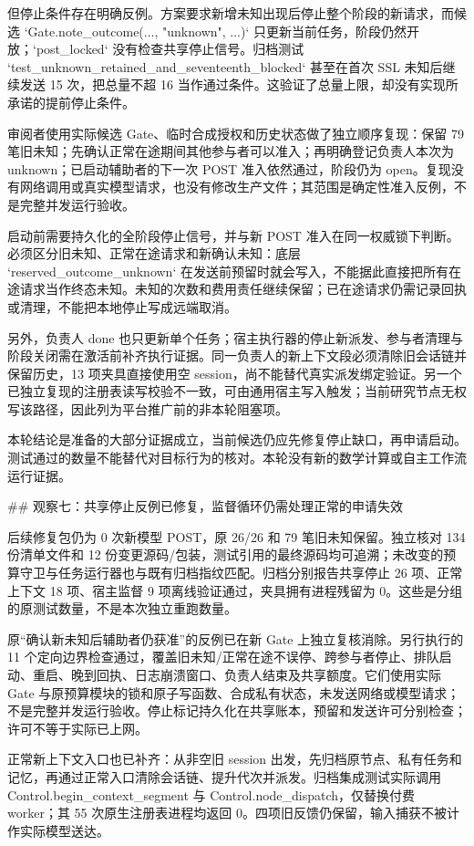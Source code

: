 但停止条件存在明确反例。方案要求新增未知出现后停止整个阶段的新请求，而候选 `Gate.note_outcome(..., "unknown", ...)` 只更新当前任务，阶段仍然开放；`post_locked` 没有检查共享停止信号。归档测试 `test_unknown_retained_and_seventeenth_blocked` 甚至在首次 SSL 未知后继续发送 15 次，把总量不超 16 当作通过条件。这验证了总量上限，却没有实现所承诺的提前停止条件。

审阅者使用实际候选 Gate、临时合成授权和历史状态做了独立顺序复现：保留 79 笔旧未知；先确认正常在途期间其他参与者可以准入；再明确登记负责人本次为 unknown；已启动辅助者的下一次 POST 准入依然通过，阶段仍为 open。复现没有网络调用或真实模型请求，也没有修改生产文件；其范围是确定性准入反例，不是完整并发运行验收。

启动前需要持久化的全阶段停止信号，并与新 POST 准入在同一权威锁下判断。必须区分旧未知、正常在途请求和新确认未知：底层 `reserved_outcome_unknown` 在发送前预留时就会写入，不能据此直接把所有在途请求当作终态未知。未知的次数和费用责任继续保留；已在途请求仍需记录回执或清理，不能把本地停止写成远端取消。

另外，负责人 done 也只更新单个任务；宿主执行器的停止新派发、参与者清理与阶段关闭需在激活前补齐执行证据。同一负责人的新上下文段必须清除旧会话链并保留历史，13 项夹具直接使用空 session，尚不能替代真实派发绑定验证。另一个已独立复现的注册表读写校验不一致，可由通用宿主写入触发；当前研究节点无权写该路径，因此列为平台推广前的非本轮阻塞项。

本轮结论是准备的大部分证据成立，当前候选仍应先修复停止缺口，再申请启动。测试通过的数量不能替代对目标行为的核对。本轮没有新的数学计算或自主工作流运行证据。

## 观察七：共享停止反例已修复，监督循环仍需处理正常的申请失效

后续修复包仍为 0 次新模型 POST，原 26/26 和 79 笔旧未知保留。独立核对 134 份清单文件和 12 份变更源码/包装，测试引用的最终源码均可追溯；未改变的预算守卫与任务运行器也与既有归档指纹匹配。归档分别报告共享停止 26 项、正常上下文 18 项、宿主监督 9 项离线验证通过，夹具拥有进程残留为 0。这些是分组的原测试数量，不是本次独立重跑数量。

原“确认新未知后辅助者仍获准”的反例已在新 Gate 上独立复核消除。另行执行的 11 个定向边界检查通过，覆盖旧未知/正常在途不误停、跨参与者停止、排队启动、重启、晚到回执、日志崩溃窗口、负责人结束及共享额度。它们使用实际 Gate 与原预算模块的锁和原子写函数、合成私有状态，未发送网络或模型请求；不是完整并发运行验收。停止标记持久化在共享账本，预留和发送许可分别检查；许可不等于实际已上网。

正常新上下文入口也已补齐：从非空旧 session 出发，先归档原节点、私有任务和记忆，再通过正常入口清除会话链、提升代次并派发。归档集成测试实际调用 Control.begin_context_segment 与 Control.node_dispatch，仅替换付费 worker；其 55 次原生注册表进程均返回 0。四项旧反馈仍保留，输入捕获不被计作实际模型送达。

